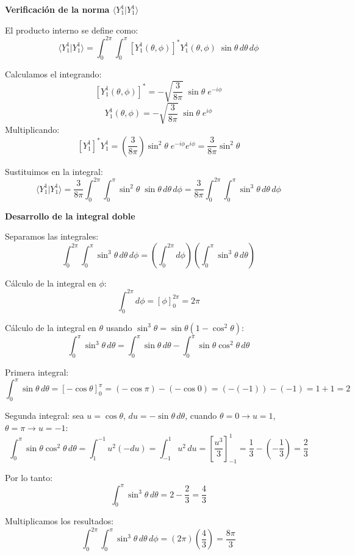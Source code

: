\documentclass[a4paper]{article}
\begin{document}
\textbf{Verificación de la norma $\langle Y_1^1 | Y_1^1 \rangle$}

El producto interno se define como:
$$
\langle Y_1^1 | Y_1^1 \rangle = \int_{0}^{2\pi} \int_{0}^{\pi} \left[ Y_1^1(\theta, \phi) \right]^* Y_1^1(\theta, \phi) \; \sin \theta \, d\theta \, d\phi
$$

Calculamos el integrando:
$$
\left[ Y_1^1(\theta, \phi) \right]^* = -\sqrt{\frac{3}{8\pi}} \; \sin \theta \; e^{-i \phi}
$$
$$
Y_1^1(\theta, \phi) = -\sqrt{\frac{3}{8\pi}} \; \sin \theta \; e^{i \phi}
$$
Multiplicando:
$$
\left[ Y_1^1 \right]^* Y_1^1 = \left( \frac{3}{8\pi} \right) \sin^2 \theta \; e^{-i\phi} e^{i\phi} = \frac{3}{8\pi} \sin^2 \theta
$$

Sustituimos en la integral:
$$
\langle Y_1^1 | Y_1^1 \rangle = \frac{3}{8\pi} \int_{0}^{2\pi} \int_{0}^{\pi} \sin^2 \theta \; \sin \theta \, d\theta \, d\phi = \frac{3}{8\pi} \int_{0}^{2\pi} \int_{0}^{\pi} \sin^3 \theta \, d\theta \, d\phi
$$

\textbf{Desarrollo de la integral doble}

Separamos las integrales:
$$
\int_{0}^{2\pi} \int_{0}^{\pi} \sin^3 \theta \, d\theta \, d\phi = \left( \int_{0}^{2\pi} d\phi \right) \left( \int_{0}^{\pi} \sin^3 \theta \, d\theta \right)
$$

Cálculo de la integral en $\phi$:
$$
\int_{0}^{2\pi} d\phi = \left[ \phi \right]_{0}^{2\pi} = 2\pi
$$

Cálculo de la integral en $\theta$ usando $\sin^3 \theta = \sin \theta (1 - \cos^2 \theta)$:
$$
\int_{0}^{\pi} \sin^3 \theta \, d\theta = \int_{0}^{\pi} \sin \theta \, d\theta - \int_{0}^{\pi} \sin \theta \cos^2 \theta \, d\theta
$$

Primera integral:
$$
\int_{0}^{\pi} \sin \theta \, d\theta = \left[ -\cos \theta \right]_{0}^{\pi} = (-\cos \pi) - (-\cos 0) = (-(-1)) - (-1) = 1 + 1 = 2
$$

Segunda integral: sea $u = \cos \theta$, $du = -\sin \theta \, d\theta$, cuando $\theta = 0 \to u = 1$, $\theta = \pi \to u = -1$:
$$
\int_{0}^{\pi} \sin \theta \cos^2 \theta \, d\theta = \int_{1}^{-1} u^2 (-du) = \int_{-1}^{1} u^2 \, du = \left[ \frac{u^3}{3} \right]_{-1}^{1} = \frac{1}{3} - \left( -\frac{1}{3} \right) = \frac{2}{3}
$$

Por lo tanto:
$$
\int_{0}^{\pi} \sin^3 \theta \, d\theta = 2 - \frac{2}{3} = \frac{4}{3}
$$

Multiplicamos los resultados:
$$
\int_{0}^{2\pi} \int_{0}^{\pi} \sin^3 \theta \, d\theta \, d\phi = (2\pi) \left( \frac{4}{3} \right) = \frac{8\pi}{3}
$$
\end{document}
